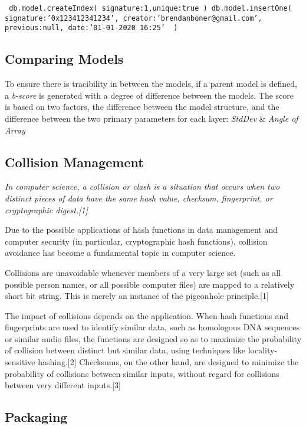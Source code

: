 \texttt{
    db.model.createIndex( {signature:1},{unique:true} )
    db.model.insertOne( { signature:'0x123412341234', creator:'brendanboner@gmail.com', previous:null, date:'01-01-2020 16:25' } )
}

\subsection{Comparing Models}
To ensure there is tracibility in between the models, if a parent model is defined, a \textit{b-score} is generated with a degree of difference between the models. The score is based on two factors, the difference between the model structure, and the difference between the two primary parameters for each layer: \textit{StdDev} \& \textit{Angle of Array}

\subsection{Collision Management}

{ \itshape
In computer science, a collision or clash is a situation that occurs when two distinct pieces of data have the same hash value, checksum, fingerprint, or cryptographic digest.[1]

Due to the possible applications of hash functions in data management and computer security (in particular, cryptographic hash functions), collision avoidance has become a fundamental topic in computer science.

Collisions are unavoidable whenever members of a very large set (such as all possible person names, or all possible computer files) are mapped to a relatively short bit string. This is merely an instance of the pigeonhole principle.[1]

The impact of collisions depends on the application. When hash functions and fingerprints are used to identify similar data, such as homologous DNA sequences or similar audio files, the functions are designed so as to maximize the probability of collision between distinct but similar data, using techniques like locality-sensitive hashing.[2] Checksums, on the other hand, are designed to minimize the probability of collisions between similar inputs, without regard for collisions between very different inputs.[3]
}


\subsection{Packaging}

